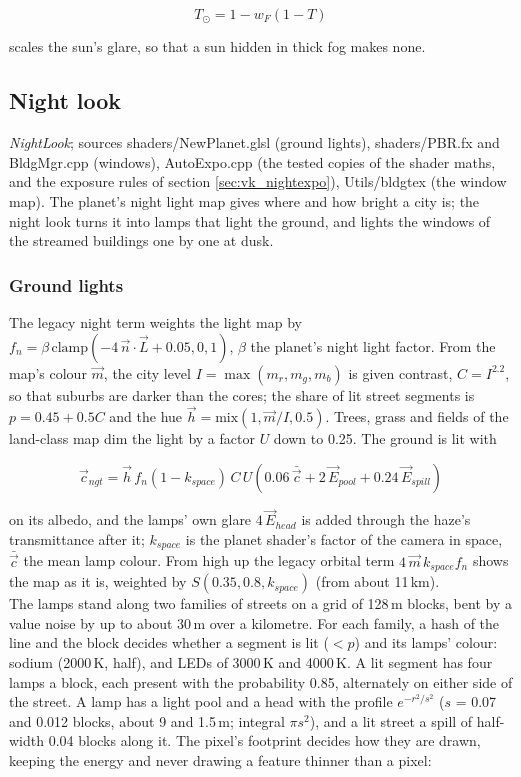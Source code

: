 \documentclass[Orbiter Technical Reference.tex]{subfiles}
\begin{document}
\begin{sloppypar}
\[ T_{\odot} = 1 - w_{F}(1 - T) \]

\noindent
scales the sun's glare, so that a sun hidden in thick fog makes none.



\subsection{Night look}\label{sec:vk_night}
\textit{NightLook}; sources shaders/NewPlanet.glsl (ground lights), shaders/PBR.fx and BldgMgr.cpp (windows), AutoExpo.cpp (the tested copies of the shader maths, and the exposure rules of section \ref{sec:vk_nightexpo}), Utils/bldgtex (the window map). The planet's night light map gives where and how bright a city is; the night look turns it into lamps that light the ground, and lights the windows of the streamed buildings one by one at dusk.

\subsubsection{Ground lights}
The legacy night term weights the light map by $f_{n} = \beta\,\mathrm{clamp}(-4\,\vec{n}\cdot\vec{L} + 0.05, 0, 1)$, $\beta$ the planet's night light factor. From the map's colour $\vec{m}$, the city level $I = \max(m_{r}, m_{g}, m_{b})$ is given contrast, $C = I^{2.2}$, so that suburbs are darker than the cores; the share of lit street segments is $p = 0.45 + 0.5C$ and the hue $\vec{h} = \mathrm{mix}(1, \vec{m}/I, 0.5)$. Trees, grass and fields of the land-class map dim the light by a factor $U$ down to 0.25. The ground is lit with

\[ \vec{c}_{ngt} = \vec{h}\,f_{n}(1 - k_{space})\,C\,U\left(0.06\,\bar{\vec{c}} + 2\,\vec{E}_{pool} + 0.24\,\vec{E}_{spill}\right) \]

\noindent
on its albedo, and the lamps' own glare $4\,\vec{E}_{head}$ is added through the haze's transmittance after it; $k_{space}$ is the planet shader's factor of the camera in space, $\bar{\vec{c}}$ the mean lamp colour. From high up the legacy orbital term $4\,\vec{m}\,k_{space}f_{n}$ shows the map as it is, weighted by $S(0.35, 0.8, k_{space})$ (from about 11\,km).\\
The lamps stand along two families of streets on a grid of 128\,m blocks, bent by a value noise by up to about 30\,m over a kilometre. For each family, a hash \cite{hoskins} of the line and the block decides whether a segment is lit ($< p$) and its lamps' colour: sodium (2000\,K, half), and LEDs of 3000\,K and 4000\,K. A lit segment has four lamps a block, each present with the probability 0.85, alternately on either side of the street. A lamp has a light pool and a head with the profile $e^{-r^{2}/s^{2}}$ ($s$ = 0.07 and 0.012 blocks, about 9 and 1.5\,m; integral $\pi s^{2}$), and a lit street a spill of half-width 0.04 blocks along it. The pixel's footprint decides how they are drawn, keeping the energy and never drawing a feature thinner than a pixel:


\end{sloppypar}
\end{document}
